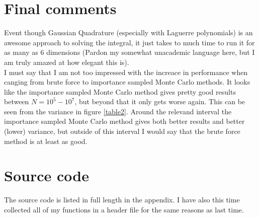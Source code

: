 \documentclass[a4paper,english, 10pt, twoside]{article}
\begin{document}
\section*{Final comments}
Event though Gaussian Quadrature (especially with Laguerre polynomials) is an awesome approach to solving the integral, it just 
takes to much time to run it for as many as 6 dimensions (Pardon my somewhat unacademic language here, but I am truly amazed 
at how elegant this is).\\
I must say that I am not too impressed with the increace in performance when canging from brute force to importance sampled 
Monte Carlo methods. It looks like the importance sampled Monte Carlo method gives pretty good results between $N = 10^5 - 10^7$, 
but beyond that it only gets worse again. This can be seen from the variance in figure \ref{table2}. Around the relevand interval 
the importance sampled Monte Carlo method gives both better results and better (lower) variance, but outside of this interval I 
would say that the brute force method is at least as good.\\

\section*{Source code}
The source code is listed in full length in the appendix. I have also this time collected all of my functions in a header file for 
the same reasons as last time.
\end{document}
